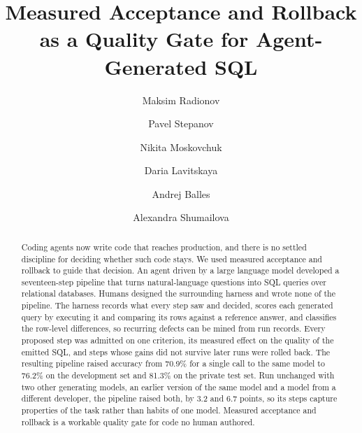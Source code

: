 \documentclass[sigplan,11pt,nonacm=true]{acmart}
\renewcommand{\_}{\textunderscore\allowbreak}
\begin{document}
\title{Measured Acceptance and Rollback as a Quality Gate for
Agent-Generated SQL}

\author{Maksim Radionov}

\author{Pavel Stepanov}

\author{Nikita Moskovchuk}

\author{Daria Lavitskaya}

\author{Andrej Balles}

\author{Alexandra Shumailova}

\renewcommand{\shortauthors}{Radionov et al.}

\begin{abstract}
Coding agents now write code that reaches production, and there is no settled
discipline for deciding whether such code stays. We used measured acceptance and rollback to guide that decision. An agent driven by a large
language model developed a seventeen-step pipeline that turns natural-language
questions into SQL queries over relational databases. Humans designed the
surrounding harness and wrote none of the pipeline. The harness records what
every step saw and decided, scores each generated query by executing it and
comparing its rows against a reference answer, and classifies the row-level
differences, so recurring defects can be mined from run records. Every proposed
step was admitted on one criterion, its measured effect on the quality of the
emitted SQL, and steps whose gains did not survive later runs were rolled
back. The resulting
pipeline raised accuracy from 70.9\% for a
single call to the same model to 76.2\% on the development set and 81.3\% on
the private test set. Run unchanged with two other generating models, an earlier
version of the same model and a model from a different developer, the
pipeline raised both, by 3.2 and 6.7 points, so its steps capture properties
of the task rather than habits of one model. Measured acceptance and rollback is a workable quality gate for code
no human authored.
\end{abstract}
\end{document}

